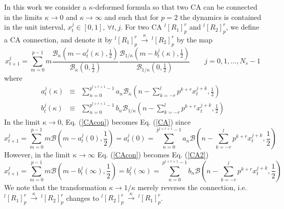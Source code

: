 \documentclass[aps,pre,preprint,floatfix]{revtex4}
\theoremstyle{plain} \newtheorem{defi}{Definition}[section]
\theoremstyle{plain} \newtheorem{prop}{Proposition}[section]
\theoremstyle{plain} \newtheorem{theor}{Theorem}[section]
\theoremstyle{plain} \newtheorem{lemma}{Lemma}[section]
\theoremstyle{plain} \newtheorem*{corol}{Corollary}
\theoremstyle{remark} \newtheorem*{rem}{Remark}
\theoremstyle{plain} \newtheorem{exer}{Exercise}[section]
\theoremstyle{remark} \newtheorem*{ans}{Answer}
\begin{document}
In this work we consider a $\kappa$-deformed formula so that two CA can be connected in the limits $\kappa \to 0$ and $\kappa \to \infty$ and such that for $p=2$ the dynamics is contained in the unit interval, $x_t^j\in [0,1]$, $\forall t,j$. For two CA $^{l}[R_{1}]_{p}^{r}$ and $^{l}[R_{2}]_{p}^{r}$, we define a CA connection, and denote it by  $^{l}[R_{1}]_{p}^{r}\ \xrightarrow{\kappa}\ ^{l}[R_{2}]_{p}^{r}$ by the map 
\begin{equation}
x_{t+1}^{j}=\sum_{m=0}^{p-1}m\frac{\mathcal{B}_{\kappa}\left(m-a_{t}^{j}(\kappa) ,\frac{1}{2}\right)}{\mathcal{B}_{\kappa}(0,\frac{1}{2})}\frac{\mathcal{B}_{1/\kappa}\left(m-b_{t}^{j}(\kappa) ,\frac{1}{2}\right)}{\mathcal{B}_{1/\kappa}(0,\frac{1}{2})}\qquad j=0,1,\ldots,N_s-1 \label{CAcon}
\end{equation}
where
\begin{eqnarray}
a_{t}^{j}(\kappa)&\equiv&\sum_{n=0}^{p^{l+r+1}-1}a_{n}\mathcal{B}_{\kappa}\left(n-\sum_{k=-r}^{l}p^{k+r}x_{t}^{j+k},\frac{1}{2}\right) \label{finfi}\\
b_{t}^{j}(\kappa)&\equiv&\sum_{n=0}^{p^{l+r+1}-1}b_{n}\mathcal{B}_{1/\kappa}\left(n-\sum_{k=-r}^{l}p^{k+r}x_{t}^{j+k},\frac{1}{2}\right) \label{g0}
\end{eqnarray}
In the limit $\kappa\to 0$, Eq. (\ref{CAcon}) becomes Eq. (\ref{CA}) since
\begin{equation}
x_{t+1}^{j}=\sum_{m=0}^{p-1}m\mathcal{B}\left(m-a_{t}^{j}(0) ,\frac{1}{2}\right)=a_{t}^{j}(0)=\sum_{n=0}^{p^{l+r+1}-1}a_{n}\mathcal{B}\left(n-\sum_{k=-r}^{l}p^{k+r}x_{t}^{j+k},\frac{1}{2}\right)
\end{equation}
However, in the limit $\kappa\to \infty$ Eq. (\ref{CAcon}) becomes Eq. (\ref{CA2})
\begin{equation}
x_{t+1}^{j}=\sum_{m=0}^{p-1}m\mathcal{B}\left(m-b_{t}^{j}(\infty) ,\frac{1}{2}\right)=b_{t}^{j}(\infty)=\sum_{n=0}^{p^{l+r+1}-1}b_{n}\mathcal{B}\left(n-\sum_{k=-r}^{l}p^{k+r}x_{t}^{j+k},\frac{1}{2}\right)
\end{equation}
We note that the transformation $\kappa \to 1/\kappa$ merely reverses the connection, i.e. $^{l}[R_{1}]_{p}^{r}\ \xrightarrow{\kappa}\ ^{l}[R_{2}]_{p}^{r}$ changes to $^{l}[R_{2}]_{p}^{r}\ \xrightarrow{\kappa}\ ^{l}[R_{1}]_{p}^{r}$.
\end{document}
